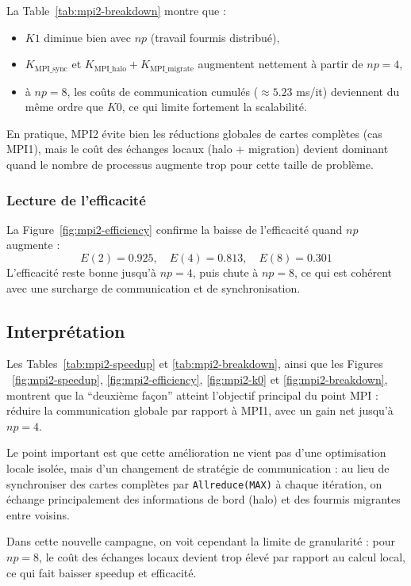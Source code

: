 La Table~\ref{tab:mpi2-breakdown} montre que :
\begin{itemize}[leftmargin=*]
  \item \(K1\) diminue bien avec \(np\) (travail fourmis distribué),
  \item \(K_{\text{MPI\_sync}}\) et \(K_{\text{MPI\_halo}}+K_{\text{MPI\_migrate}}\) augmentent
  nettement à partir de \(np=4\),
  \item à \(np=8\), les coûts de communication cumulés (\(\approx 5.23\) ms/it) deviennent
  du même ordre que \(K0\), ce qui limite fortement la scalabilité.
\end{itemize}

En pratique, MPI2 évite bien les réductions globales de cartes complètes (cas MPI1), mais
le coût des échanges locaux (halo + migration) devient dominant quand le nombre de processus
augmente trop pour cette taille de problème.

\subsubsection{Lecture de l'efficacité}

La Figure~\ref{fig:mpi2-efficiency} confirme la baisse de l'efficacité quand \(np\) augmente :
\[
E(2)=0.925,\quad E(4)=0.813,\quad E(8)=0.301
\]
L'efficacité reste bonne jusqu'à \(np=4\), puis chute à \(np=8\), ce qui est cohérent
avec une surcharge de communication et de synchronisation.

\subsection{Interprétation}

Les Tables~\ref{tab:mpi2-speedup} et \ref{tab:mpi2-breakdown}, ainsi que les Figures
~\ref{fig:mpi2-speedup}, \ref{fig:mpi2-efficiency}, \ref{fig:mpi2-k0} et \ref{fig:mpi2-breakdown},
montrent que la ``deuxième façon'' atteint l'objectif principal du point MPI :
réduire la communication globale par rapport à MPI1, avec un gain net jusqu'à \(np=4\).

Le point important est que cette amélioration ne vient pas d'une optimisation locale isolée,
mais d'un changement de stratégie de communication :
au lieu de synchroniser des cartes complètes par \texttt{Allreduce(MAX)} à chaque itération,
on échange principalement des informations de bord (halo) et des fourmis migrantes entre voisins.

Dans cette nouvelle campagne, on voit cependant la limite de granularité :
pour \(np=8\), le coût des échanges locaux devient trop élevé par rapport au calcul local,
ce qui fait baisser speedup et efficacité.

